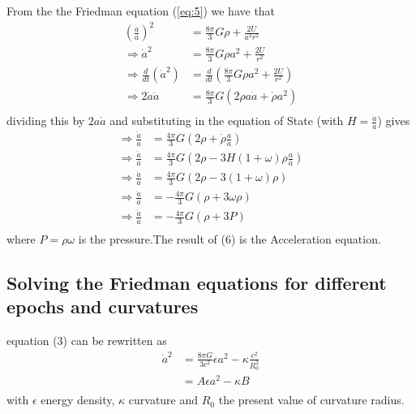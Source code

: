 \documentclass[a4paper, 11pt]{FSKH_623_Report}
\numberwithin{equation}{section}
\newcommand{\driv}[2]{\frac{d #1}{d #2}}
\begin{document}
From the the Friedman equation (\ref{eq:5}) we have that
\begin{equation}
\begin{split}
\left(\frac{\dot{a}}{a}\right)^{2} &= \frac{8\pi}{3}G\rho+\frac{2U}{a^{2}r^{2}}\\
\Rightarrow \dot{a}^{2} &= \frac{8\pi}{3}G\rho a^{2}+\frac{2U}{r^{2}}\\
\Rightarrow \driv{}{t}\left(\dot{a}^{2}\right) &= \driv{}{t}\left(\frac{8\pi}{3}G\rho a^{2}+\frac{2U}{r^{2}}\right)\\
\Rightarrow 2\dot{a}\ddot{a} &= \frac{8\pi}{3}G\left(2\rho a\dot{a}+\dot{\rho}a^{2}\right)\\
\end{split}
\end{equation}
dividing this by $2a\dot{a}$ and substituting in the equation of State (with $H=\frac{\dot{a}}{a}$) gives
\begin{equation}
\begin{split}
\Rightarrow \frac{\ddot{a}}{a} &= \frac{4\pi}{3}G\left(2\rho +\dot{\rho}\frac{a}{\dot{a}}\right)\\
\Rightarrow \frac{\ddot{a}}{a} &= \frac{4\pi}{3}G\left(2\rho -3H\left(1+\omega\right)\rho\frac{a}{\dot{a}}\right)\\
\Rightarrow \frac{\ddot{a}}{a} &= \frac{4\pi}{3}G\left(2\rho -3\left(1+\omega\right)\rho\right)\\
\Rightarrow \frac{\ddot{a}}{a} &= -\frac{4\pi}{3}G\left(\rho +3\omega\rho\right)\\
\Rightarrow \frac{\ddot{a}}{a} &= -\frac{4\pi}{3}G\left(\rho +3P\right)\\
\end{split}
\end{equation}
where $P=\rho\omega$ is the pressure.The result of (6) is the Acceleration equation.

\subsection*{Solving the Friedman equations for different epochs and curvatures}
equation (3) can be rewritten as \citep{notes4}
\begin{equation}
\begin{split}
\dot{a}^{2} &= \frac{8\pi G}{3c^{2}}\epsilon a^{2}-\kappa\frac{c^{2}}{R_{0}^{2}}\\
&= A\epsilon a^{2}-\kappa B\\
\end{split}
\end{equation}
with $\epsilon$ energy density, $\kappa$ curvature and $R_{0}$ the present value of curvature radius.
\end{document}
